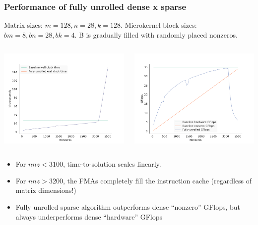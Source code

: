 \documentclass[9pt]{beamer}
\begin{document}
\begin{frame}[fragile]
  \frametitle{Performance of fully unrolled dense x sparse}
  Matrix sizes: $m=128, n=28, k=128$.
  Microkernel block sizes: $bm=8, bn=28, bk=4$.
  B is gradually filled with randomly placed nonzeros.

  \begin{columns}[t]
    \begin{column}{0.6\textwidth}
      \centering
      \includegraphics[width=6.5cm]{images/fig2.pdf}
    \end{column}
    \begin{column}{0.6\textwidth}
      \centering
      \includegraphics[width=6.5cm]{images/fig3.pdf}
    \end{column}
  \end{columns}

  \begin{itemize}
    \item For $nnz < 3100$, time-to-solution scales linearly.
    \item For $nnz > 3200$, the FMAs completely fill the instruction cache (regardless of matrix dimensions!)
    \item Fully unrolled sparse algorithm outperforms dense ``nonzero'' GFlops, but always underperforms dense ``hardware'' GFlops
    
  \end{itemize}
\end{frame}
\end{document}
